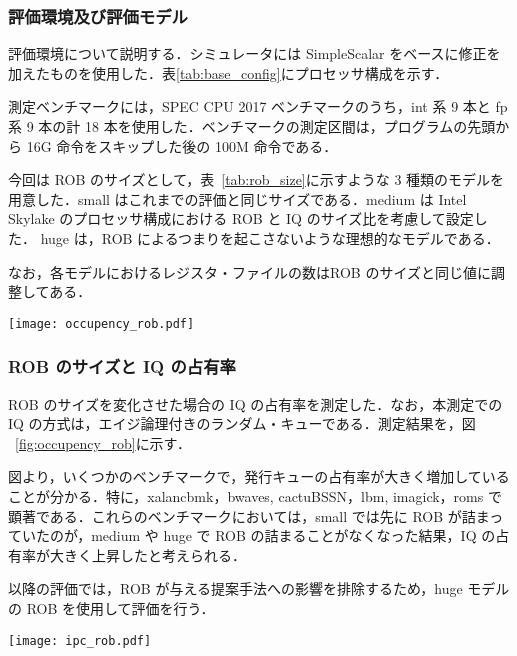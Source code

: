 \documentclass[twocolumn]{jsarticle}
\begin{document}
  \subsubsection{評価環境及び評価モデル}
  \label{sec:config}
  評価環境について説明する．シミュレータには SimpleScalar をベースに修正を加えたものを使用した．表\ref{tab:base_config}にプロセッサ構成を示す． 
  
  測定ベンチマークには，SPEC CPU 2017 ベンチマークのうち，int 系 9 本と fp 系 9 本の計 18 本を使用した．ベンチマークの測定区間は，プログラムの先頭から 16G 命令をスキップした後の 100M 命令である．

  今回は ROB のサイズとして，表~\ref{tab:rob_size}に示すような 3 種類のモデルを用意した．small はこれまでの評価と同じサイズである．medium は Intel Skylake のプロセッサ構成における ROB と IQ のサイズ比を考慮して設定した． huge は，ROB によるつまりを起こさないような理想的なモデルである．

  なお，各モデルにおけるレジスタ・ファイルの数はROB のサイズと同じ値に調整してある．
  \begin{figure*}[ht]
    \centering
    \texttt{[image: occupency\_rob.pdf]}
    \caption{ROB のサイズが与える IQ の占有率への影響}
    \label{fig:occupency_rob}
  \end{figure*}

  \subsubsection{ROB のサイズと IQ の占有率}
  ROB のサイズを変化させた場合の IQ の占有率を測定した．なお，本測定での IQ の方式は，エイジ論理付きのランダム・キューである．測定結果を，図 ~\ref{fig:occupency_rob}に示す．

  図より，いくつかのベンチマークで，発行キューの占有率が大きく増加していることが分かる．特に，xalancbmk，bwaves, cactuBSSN，lbm, imagick，roms で顕著である．これらのベンチマークにおいては，small では先に ROB が詰まっていたのが，medium や huge で ROB の詰まることがなくなった結果，IQ の占有率が大きく上昇したと考えられる．
  
  以降の評価では，ROB が与える提案手法への影響を排除するため，huge モデルの ROB を使用して評価を行う．
  
  \begin{figure*}[ht]
    \centering
    \texttt{[image: ipc\_rob.pdf]}
    \caption{提案手法における性能変化(hugeモデル)}
    \label{fig:ipc_rob}
  \end{figure*}
\end{document}
